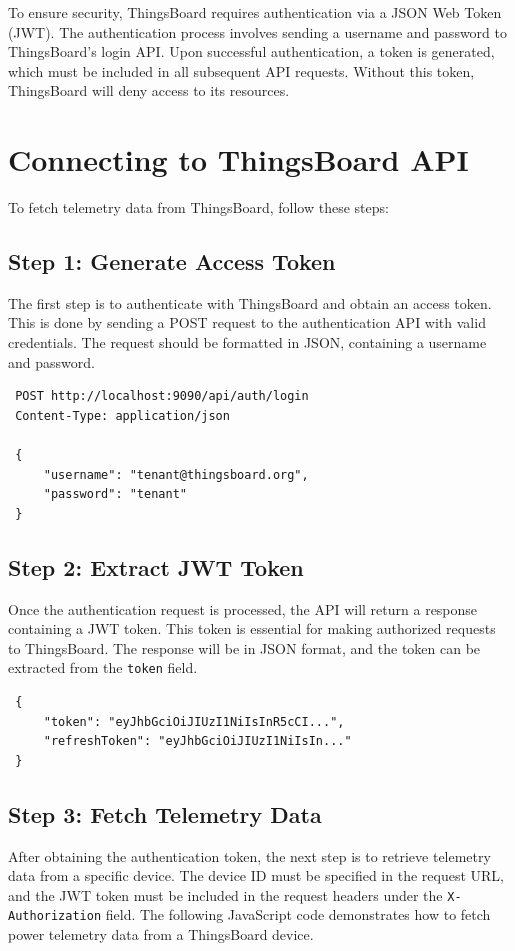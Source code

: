 \documentclass[a4paper,12pt]{report}
\begin{document}
 To ensure security, ThingsBoard requires authentication via a JSON Web Token (JWT). The authentication process involves sending a username and password to ThingsBoard’s login API. Upon successful authentication, a token is generated, which must be included in all subsequent API requests. Without this token, ThingsBoard will deny access to its resources.
 
 \section{Connecting to ThingsBoard API}
 
 To fetch telemetry data from ThingsBoard, follow these steps:
 
 \subsection{Step 1: Generate Access Token}
 The first step is to authenticate with ThingsBoard and obtain an access token. This is done by sending a POST request to the authentication API with valid credentials. The request should be formatted in JSON, containing a username and password.
 
 \begin{lstlisting}
 POST http://localhost:9090/api/auth/login
 Content-Type: application/json
 
 {
     "username": "tenant@thingsboard.org",
     "password": "tenant"
 }
 \end{lstlisting}
 
 \subsection{Step 2: Extract JWT Token}
 Once the authentication request is processed, the API will return a response containing a JWT token. This token is essential for making authorized requests to ThingsBoard. The response will be in JSON format, and the token can be extracted from the \texttt{token} field.
 
 \begin{lstlisting}
 {
     "token": "eyJhbGciOiJIUzI1NiIsInR5cCI...",
     "refreshToken": "eyJhbGciOiJIUzI1NiIsIn..."
 }
 \end{lstlisting}
 
 \subsection{Step 3: Fetch Telemetry Data}
 After obtaining the authentication token, the next step is to retrieve telemetry data from a specific device. The device ID must be specified in the request URL, and the JWT token must be included in the request headers under the \texttt{X-Authorization} field. The following JavaScript code demonstrates how to fetch power telemetry data from a ThingsBoard device.
 
\end{document}

